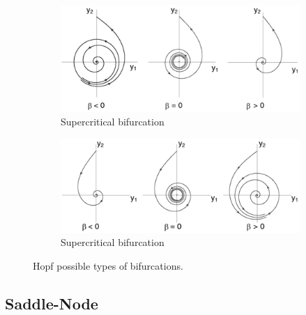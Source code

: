 \begin{figure}[H]
     \centering
     \begin{subfigure}[b]{0.7\textwidth}
         \centering
         \includegraphics[width=\textwidth]{Images/SubHopf.png}
         \caption{Supercritical bifurcation}
         \label{fig:sub_hopf}
     \end{subfigure}
     \hfill
     \begin{subfigure}[b]{0.7\textwidth}
         \centering
         \includegraphics[width=\textwidth]{Images/SuperHopf.png}
         \caption{Supercritical bifurcation}
         \label{fig:sup-hopf}
     \end{subfigure}
     \hfill
        \caption{Hopf possible types of bifurcations.}
        \label{fig:hopf_types}
\end{figure}


\subsection{Saddle-Node}

